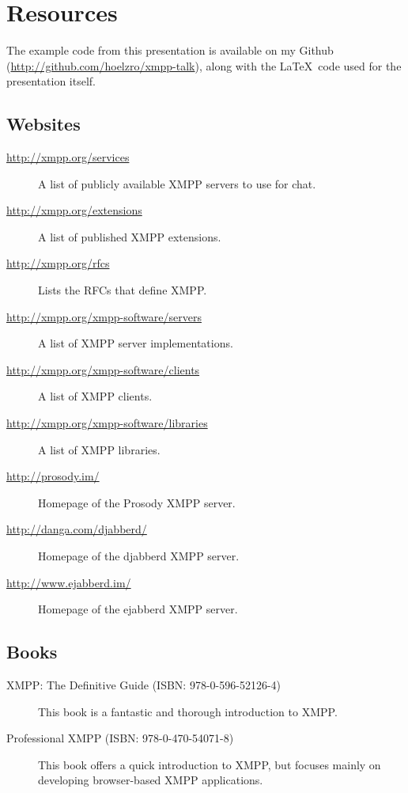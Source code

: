 \appendix
\section{Resources}

The example code from this presentation is available on my Github (\url{http://github.com/hoelzro/xmpp-talk}), along
with the \LaTeX\ code used for the presentation itself.

\subsection*{Websites}

\begin{description}
\item[\url{http://xmpp.org/services}] A list of publicly available XMPP servers to use for chat.
\item[\url{http://xmpp.org/extensions}] A list of published XMPP extensions.
\item[\url{http://xmpp.org/rfcs}] Lists the RFCs that define XMPP.
\item[\url{http://xmpp.org/xmpp-software/servers}] A list of XMPP server implementations.
\item[\url{http://xmpp.org/xmpp-software/clients}] A list of XMPP clients.
\item[\url{http://xmpp.org/xmpp-software/libraries}] A list of XMPP libraries.
\item[\url{http://prosody.im/}] Homepage of the Prosody XMPP server.
\item[\url{http://danga.com/djabberd/}] Homepage of the djabberd XMPP server.
\item[\url{http://www.ejabberd.im/}] Homepage of the ejabberd XMPP server.
\end{description}

\subsection*{Books}

\begin{description}
\item[XMPP: The Definitive Guide (ISBN: 978-0-596-52126-4)] This book is a fantastic and thorough introduction to XMPP.
\item[Professional XMPP (ISBN: 978-0-470-54071-8)] This book offers a quick introduction to XMPP, but focuses mainly on developing browser-based XMPP applications.
\end{description}

